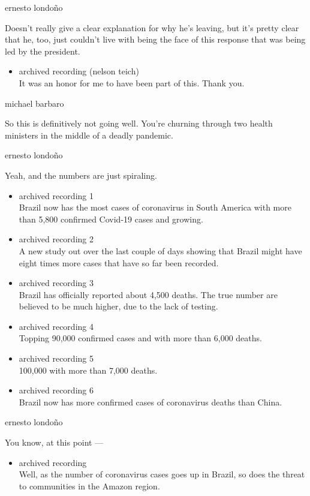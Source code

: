 ernesto londoño

Doesn't really give a clear explanation for why he's leaving, but it's
pretty clear that he, too, just couldn't live with being the face of
this response that was being led by the president.

\begin{itemize}
\tightlist
\item
  archived recording (nelson teich)\\
  It was an honor for me to have been part of this. Thank you.
\end{itemize}

michael barbaro

So this is definitively not going well. You're churning through two
health ministers in the middle of a deadly pandemic.

ernesto londoño

Yeah, and the numbers are just spiraling.

\begin{itemize}
\item
  archived recording 1\\
  Brazil now has the most cases of coronavirus in South America with
  more than 5,800 confirmed Covid-19 cases and growing.
\item
  archived recording 2\\
  A new study out over the last couple of days showing that Brazil might
  have eight times more cases that have so far been recorded.
\item
  archived recording 3\\
  Brazil has officially reported about 4,500 deaths. The true number are
  believed to be much higher, due to the lack of testing.
\item
  archived recording 4\\
  Topping 90,000 confirmed cases and with more than 6,000 deaths.
\item
  archived recording 5\\
  100,000 with more than 7,000 deaths.
\item
  archived recording 6\\
  Brazil now has more confirmed cases of coronavirus deaths than China.
\end{itemize}

ernesto londoño

You know, at this point ---

\begin{itemize}
\tightlist
\item
  archived recording\\
  Well, as the number of coronavirus cases goes up in Brazil, so does
  the threat to communities in the Amazon region.
\end{itemize}


